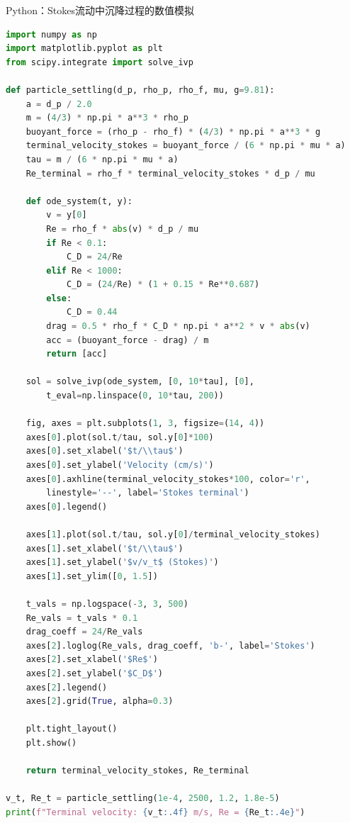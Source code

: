 \begin{mycode}{Python：Stokes流动中沉降过程的数值模拟}
\begin{lstlisting}[language=Python]
import numpy as np
import matplotlib.pyplot as plt
from scipy.integrate import solve_ivp

def particle_settling(d_p, rho_p, rho_f, mu, g=9.81):
    a = d_p / 2.0
    m = (4/3) * np.pi * a**3 * rho_p
    buoyant_force = (rho_p - rho_f) * (4/3) * np.pi * a**3 * g
    terminal_velocity_stokes = buoyant_force / (6 * np.pi * mu * a)
    tau = m / (6 * np.pi * mu * a)
    Re_terminal = rho_f * terminal_velocity_stokes * d_p / mu
    
    def ode_system(t, y):
        v = y[0]
        Re = rho_f * abs(v) * d_p / mu
        if Re < 0.1:
            C_D = 24/Re
        elif Re < 1000:
            C_D = (24/Re) * (1 + 0.15 * Re**0.687)
        else:
            C_D = 0.44
        drag = 0.5 * rho_f * C_D * np.pi * a**2 * v * abs(v)
        acc = (buoyant_force - drag) / m
        return [acc]
    
    sol = solve_ivp(ode_system, [0, 10*tau], [0],
        t_eval=np.linspace(0, 10*tau, 200))
    
    fig, axes = plt.subplots(1, 3, figsize=(14, 4))
    axes[0].plot(sol.t/tau, sol.y[0]*100)
    axes[0].set_xlabel('$t/\\tau$')
    axes[0].set_ylabel('Velocity (cm/s)')
    axes[0].axhline(terminal_velocity_stokes*100, color='r',
        linestyle='--', label='Stokes terminal')
    axes[0].legend()
    
    axes[1].plot(sol.t/tau, sol.y[0]/terminal_velocity_stokes)
    axes[1].set_xlabel('$t/\\tau$')
    axes[1].set_ylabel('$v/v_t$ (Stokes)')
    axes[1].set_ylim([0, 1.5])
    
    t_vals = np.logspace(-3, 3, 500)
    Re_vals = t_vals * 0.1
    drag_coeff = 24/Re_vals
    axes[2].loglog(Re_vals, drag_coeff, 'b-', label='Stokes')
    axes[2].set_xlabel('$Re$')
    axes[2].set_ylabel('$C_D$')
    axes[2].legend()
    axes[2].grid(True, alpha=0.3)
    
    plt.tight_layout()
    plt.show()
    
    return terminal_velocity_stokes, Re_terminal

v_t, Re_t = particle_settling(1e-4, 2500, 1.2, 1.8e-5)
print(f"Terminal velocity: {v_t:.4f} m/s, Re = {Re_t:.4e}")
\end{lstlisting}
\end{mycode}

